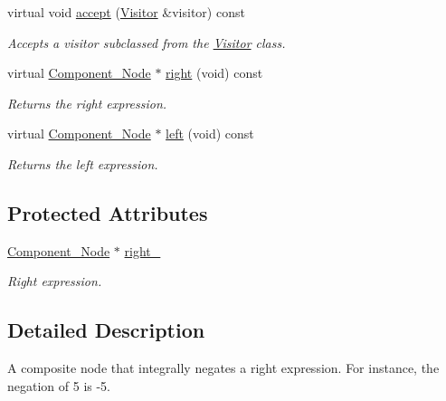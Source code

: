 \begin{DoxyCompactItemize}
virtual void \hyperlink{classMadara_1_1Expression__Tree_1_1Composite__Negate__Node_a35f42733f97befd885ceca35282f228c}{accept} (\hyperlink{classMadara_1_1Expression__Tree_1_1Visitor}{Visitor} \&visitor) const 
\begin{DoxyCompactList}\small\item\em Accepts a visitor subclassed from the \hyperlink{classMadara_1_1Expression__Tree_1_1Visitor}{Visitor} class. \item\end{DoxyCompactList}\item 
virtual \hyperlink{classMadara_1_1Expression__Tree_1_1Component__Node}{Component\_\-Node} $\ast$ \hyperlink{classMadara_1_1Expression__Tree_1_1Composite__Unary__Node_ade55cde5707e0fa73ab1c019159b9aec}{right} (void) const 
\begin{DoxyCompactList}\small\item\em Returns the right expression. \item\end{DoxyCompactList}\item 
virtual \hyperlink{classMadara_1_1Expression__Tree_1_1Component__Node}{Component\_\-Node} $\ast$ \hyperlink{classMadara_1_1Expression__Tree_1_1Component__Node_abe0c7474f1af4cb06d06ab13479a89db}{left} (void) const 
\begin{DoxyCompactList}\small\item\em Returns the left expression. \item\end{DoxyCompactList}\end{DoxyCompactItemize}
\subsection*{Protected Attributes}
\begin{DoxyCompactItemize}
\item 
\hyperlink{classMadara_1_1Expression__Tree_1_1Component__Node}{Component\_\-Node} $\ast$ \hyperlink{classMadara_1_1Expression__Tree_1_1Composite__Unary__Node_a077b7bd1b52df6f5c6adfde735556a68}{right\_\-}
\begin{DoxyCompactList}\small\item\em Right expression. \item\end{DoxyCompactList}\end{DoxyCompactItemize}


\subsection{Detailed Description}
A composite node that integrally negates a right expression. For instance, the negation of 5 is -\/5. 

